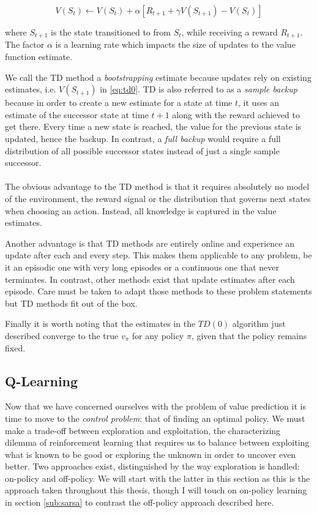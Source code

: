 \begin{equation}
  \label{eq:td0}
  V(S_t) \leftarrow V(S_t) + \alpha \left[ R_{t+1} + \gamma V(S_{t+1}) - V(S_t) \right]
\end{equation}

where $S_{t+1}$ is the state transitioned to from $S_t$,
while receiving a reward $R_{t+1}$.
The factor $\alpha$ is a learning rate which impacts
the size of updates to the value function estimate.

We call the TD method a \textit{bootstrapping} estimate
because updates rely on existing estimates,
i.e. $V(S_{t+1})$ in \ref{eq:td0}.
TD is also referred to as a \textit{sample backup}
because in order to create a new estimate
for a state at time $t$, it uses an estimate
of the successor state at time $t+1$
along with the reward achieved to get there.
Every time a new state is reached,
the value for the previous state is updated,
hence the backup.
In contrast, a \textit{full backup}
would require a full distribution of all possible successor states
instead of just a single sample successor.

\paragraph{}
The obvious advantage to the TD method
is that it requires absolutely no model
of the environment, the reward signal
or the distribution that governs next states when choosing an action.
Instead, all knowledge is captured
in the value estimates.

Another advantage is that TD methods are entirely online
and experience an update after each and every step.
This makes them applicable to any problem,
be it an episodic one with very long episodes
or a continuous one that never terminates.
In contrast, other methods exist that update estimates
after each episode.
Care must be taken to adapt those methods to these problem statements
but TD methods fit out of the box.

Finally it is worth noting that the estimates
in the $TD(0)$ algorithm just described
converge to the true $v_\pi$
for any policy $\pi$,
given that the policy remains fixed.

\subsection{Q-Learning}
\label{sub:qlearning}
Now that we have concerned ourselves with the problem
of value prediction
it is time to move to the \textit{control problem}:
that of finding an optimal policy.
We must make a trade-off between exploration and exploitation,
the characterizing dilemma of reinforcement learning
that requires us to balance between
exploiting what is known to be good
or exploring the unknown in order to uncover even better.
Two approaches exist,
distinguished by the way
exploration is handled:
on-policy and off-policy.
We will start with the latter in this section
as this is the approach taken throughout this thesis,
though I will touch on on-policy learning
in section \ref{sub:sarsa}
to contrast the off-policy approach described here.

